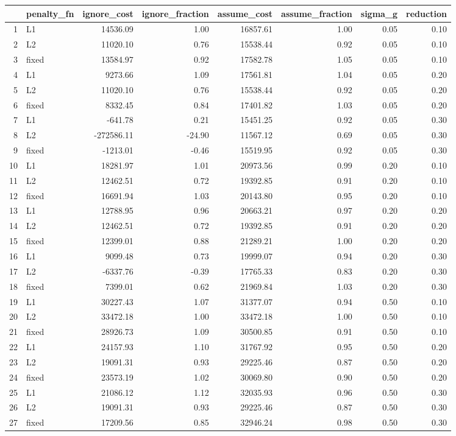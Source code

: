 \documentclass{article}\usepackage{graphicx, color}
\begin{document}
\begin{table}[ht]
\centering
\begin{tabular}{rlrrrrrr}
  \hline
 & penalty\_fn & ignore\_cost & ignore\_fraction & assume\_cost & assume\_fraction & sigma\_g & reduction \\ 
  \hline
1 & L1 & 14536.09 & 1.00 & 16857.61 & 1.00 & 0.05 & 0.10 \\ 
  2 & L2 & 11020.10 & 0.76 & 15538.44 & 0.92 & 0.05 & 0.10 \\ 
  3 & fixed & 13584.97 & 0.92 & 17582.78 & 1.05 & 0.05 & 0.10 \\ 
  4 & L1 & 9273.66 & 1.09 & 17561.81 & 1.04 & 0.05 & 0.20 \\ 
  5 & L2 & 11020.10 & 0.76 & 15538.44 & 0.92 & 0.05 & 0.20 \\ 
  6 & fixed & 8332.45 & 0.84 & 17401.82 & 1.03 & 0.05 & 0.20 \\ 
  7 & L1 & -641.78 & 0.21 & 15451.25 & 0.92 & 0.05 & 0.30 \\ 
  8 & L2 & -272586.11 & -24.90 & 11567.12 & 0.69 & 0.05 & 0.30 \\ 
  9 & fixed & -1213.01 & -0.46 & 15519.95 & 0.92 & 0.05 & 0.30 \\ 
  10 & L1 & 18281.97 & 1.01 & 20973.56 & 0.99 & 0.20 & 0.10 \\ 
  11 & L2 & 12462.51 & 0.72 & 19392.85 & 0.91 & 0.20 & 0.10 \\ 
  12 & fixed & 16691.94 & 1.03 & 20143.80 & 0.95 & 0.20 & 0.10 \\ 
  13 & L1 & 12788.95 & 0.96 & 20663.21 & 0.97 & 0.20 & 0.20 \\ 
  14 & L2 & 12462.51 & 0.72 & 19392.85 & 0.91 & 0.20 & 0.20 \\ 
  15 & fixed & 12399.01 & 0.88 & 21289.21 & 1.00 & 0.20 & 0.20 \\ 
  16 & L1 & 9099.48 & 0.73 & 19999.07 & 0.94 & 0.20 & 0.30 \\ 
  17 & L2 & -6337.76 & -0.39 & 17765.33 & 0.83 & 0.20 & 0.30 \\ 
  18 & fixed & 7399.01 & 0.62 & 21969.84 & 1.03 & 0.20 & 0.30 \\ 
  19 & L1 & 30227.43 & 1.07 & 31377.07 & 0.94 & 0.50 & 0.10 \\ 
  20 & L2 & 33472.18 & 1.00 & 33472.18 & 1.00 & 0.50 & 0.10 \\ 
  21 & fixed & 28926.73 & 1.09 & 30500.85 & 0.91 & 0.50 & 0.10 \\ 
  22 & L1 & 24157.93 & 1.10 & 31767.92 & 0.95 & 0.50 & 0.20 \\ 
  23 & L2 & 19091.31 & 0.93 & 29225.46 & 0.87 & 0.50 & 0.20 \\ 
  24 & fixed & 23573.19 & 1.02 & 30069.80 & 0.90 & 0.50 & 0.20 \\ 
  25 & L1 & 21086.12 & 1.12 & 32035.93 & 0.96 & 0.50 & 0.30 \\ 
  26 & L2 & 19091.31 & 0.93 & 29225.46 & 0.87 & 0.50 & 0.30 \\ 
  27 & fixed & 17209.56 & 0.85 & 32946.24 & 0.98 & 0.50 & 0.30 \\ 
   \hline
\end{tabular}
\end{table}
\end{document}
